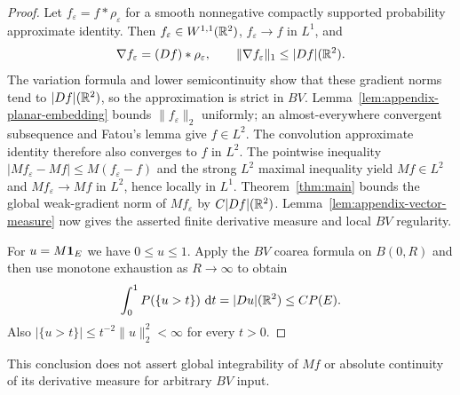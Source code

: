 \begin{proof}
Let $f_\varepsilon=f*\rho_\varepsilon$ for a smooth nonnegative
compactly supported probability approximate identity. Then
$f_\varepsilon\in W^{1,1}(\mathbb R^2)$, $f_\varepsilon\to f$ in $L^1$,
and
\[
 \nabla f_\varepsilon=(Df)*\rho_\varepsilon,\qquad
 \|\nabla f_\varepsilon\|_1\le |Df|(\mathbb R^2).
\]
The variation formula and lower semicontinuity show that these
gradient norms tend to $|Df|(\mathbb R^2)$, so the approximation is strict
in $BV$. Lemma~\ref{lem:appendix-planar-embedding} bounds
$\|f_\varepsilon\|_2$ uniformly; an almost-everywhere convergent
subsequence and Fatou's lemma give $f\in L^2$. The convolution
approximate identity therefore also converges to $f$ in $L^2$.
The pointwise inequality
$|Mf_\varepsilon-Mf|\le M(f_\varepsilon-f)$ and the strong $L^2$
maximal inequality yield $Mf\in L^2$ and
$Mf_\varepsilon\to Mf$ in $L^2$, hence locally in $L^1$.
Theorem~\ref{thm:main} bounds the global weak-gradient norm of
$Mf_\varepsilon$ by $C|Df|(\mathbb R^2)$.
Lemma~\ref{lem:appendix-vector-measure} now gives the asserted
finite derivative measure and local $BV$ regularity.

For $u=M\mathbf 1_E$ we have $0\le u\le1$. Apply the $BV$ coarea formula
\cite{EvansGariepy2015} on $B(0,R)$ and then use monotone exhaustion
as $R\to\infty$ to obtain
\[
 \int_0^1 P(\{u>t\})\,\mathop{}\!\mathrm{d} t
 =|Du|(\mathbb R^2)\le CP(E).
\]
Also $|\{u>t\}|\le t^{-2}\|u\|_2^2<\infty$ for every $t>0$.
\end{proof}

This conclusion does not assert global integrability of $Mf$ or
absolute continuity of its derivative measure for arbitrary $BV$ input.
